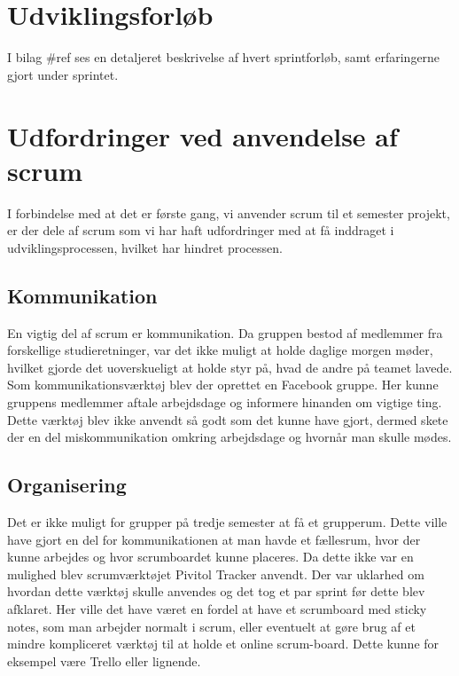 \chapter{Udviklingsforløb}
I bilag \#ref ses en detaljeret beskrivelse af hvert sprintforløb, samt erfaringerne gjort under sprintet.

\chapter{Udfordringer ved anvendelse af scrum}
I forbindelse med at det er første gang, vi anvender scrum til et semester projekt, er der dele af scrum som vi har haft udfordringer med at få inddraget i udviklingsprocessen, hvilket har hindret processen.

\section{Kommunikation}
En vigtig del af scrum er kommunikation. Da gruppen bestod af medlemmer fra forskellige studieretninger, var det ikke muligt at holde daglige morgen møder, hvilket gjorde det uoverskueligt at holde styr på, hvad de andre på teamet lavede. Som kommunikationsværktøj blev der oprettet en Facebook gruppe. Her kunne gruppens medlemmer aftale arbejdsdage og informere hinanden om vigtige ting. Dette værktøj blev ikke anvendt så godt som det kunne have gjort, dermed skete der en del miskommunikation omkring arbejdsdage og hvornår man skulle mødes. \par

\section{Organisering}
Det er ikke muligt for grupper på tredje semester at få et grupperum. Dette ville have gjort en del for kommunikationen at man havde et fællesrum, hvor der kunne arbejdes og hvor scrumboardet kunne placeres. Da dette ikke var en mulighed blev scrumværktøjet Pivitol Tracker anvendt. Der var uklarhed om hvordan dette værktøj skulle anvendes og det tog et par sprint før dette blev afklaret. Her ville det have været en fordel at have et scrumboard med sticky notes, som man arbejder normalt i scrum, eller eventuelt at gøre brug af et mindre kompliceret værktøj til at holde et online scrum-board. Dette kunne for eksempel være Trello eller lignende. 

